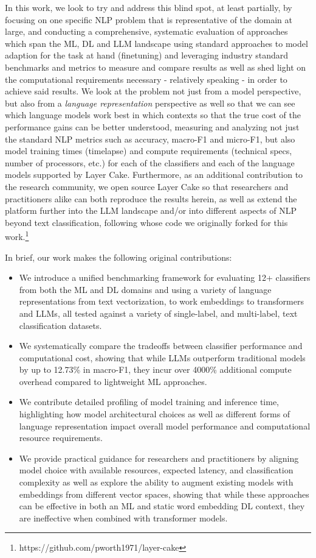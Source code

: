 \documentclass[final]{clv2025}
\begin{document}
In this work, we look to try and address this blind spot, at least partially, by focusing on one specific NLP problem that is representative of the domain at large, and conducting a comprehensive, systematic evaluation of approaches which span the ML, DL and LLM landscape using standard approaches to model adaption for the task at hand (finetuning) and leveraging industry standard benchmarks and metrics to measure and compare results as well as shed light on the computational requirements necessary - relatively speaking - in order to achieve said results. We look at the problem not just from a model perspective, but also from a \textit{language representation} perspective as well so that we can see which language models work best in which contexts so that the true cost of the performance gains can be better understood, measuring and analyzing not just the standard NLP metrics such as accuracy, macro-F1 and micro-F1, but also model training times (timelapse) and compute requirements (technical specs, number of processors, etc.) for each of the classifiers and each of the language models supported by Layer Cake. Furthermore, as an additional contribution to the research community, we open source Layer Cake so that researchers and practitioners alike can both reproduce the results herein, as well as extend the platform further into the LLM landscape and/or into different aspects of NLP beyond text classification, following \cite{moreo} whose code we originally forked for this work.\footnote{  https://github.com/pworth1971/layer-cake}

In brief, our work makes the following original contributions:

\begin{itemize}
    \item We introduce a unified benchmarking framework for evaluating 12+ classifiers from both the ML and DL domains and using a variety of language representations from text vectorization, to work embeddings to transformers and LLMs, all tested against a variety of single-label, and multi-label, text classification datasets.
    \item We systematically compare the tradeoffs between classifier performance and computational cost, showing that while LLMs outperform traditional models by up to 12.73\% in macro-F1, they incur over 4000\% additional compute overhead compared to lightweight ML approaches.
    \item We contribute detailed profiling of model training and inference time, highlighting how model architectural choices as well as different forms of language representation impact overall model performance and computational resource requirements.
    \item We provide practical guidance for researchers and practitioners by aligning model choice with available resources, expected latency, and classification complexity as well as explore the ability to augment existing models with embeddings from different vector spaces, showing that while these approaches can be effective in both an ML and static word embedding DL context, they are ineffective when combined with transformer models.
\end{itemize}
\end{document}
